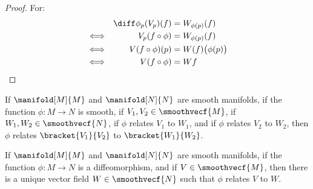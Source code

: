 \documentclass{article}                                                        %
\begin{document}
            \begin{proof}
                For:
                \begin{align}
                    &&\diff\phi_{p}(V_{p})(f)&=W_{\phi(p)}(f)\\
                    &\Longleftrightarrow&
                    V_{p}(f\circ\phi)&=W_{\phi(p)}(f)\\
                    &\Longleftrightarrow&
                    V(f\circ\phi)(p)&=W(f)\big(\phi(p)\big)\\
                    &\Longleftrightarrow&
                    V(f\circ\phi)&=Wf
                \end{align}
            \end{proof}
            \begin{theorem}
                If $\manifold[M]{M}$ and $\manifold[N]{N}$ are smooth manifolds,
                if the function $\phi:M\rightarrow{N}$ is smooth, if
                $V_{1},V_{2}\in\smoothvecf{M}$, if
                $W_{1},W_{2}\in\smoothvecf{N}$, if $\phi$ relates $V_{1}$ to
                $W_{1}$, and if $\phi$ relates $V_{2}$ to $W_{2}$, then
                $\phi$ relates $\bracket{V_{1}}{V_{2}}$ to
                $\bracket{W_{1}}{W_{2}}$.
            \end{theorem}
            \begin{theorem}
                If $\manifold[M]{M}$ and $\manifold[N]{N}$ are smooth manifolds,
                if the function $\phi:M\rightarrow{N}$ is a diffeomorphism, and
                if $V\in\smoothvecf{M}$, then there is a unique vector field
                $W\in\smoothvecf{N}$ such that $\phi$ relates $V$ to $W$.
            \end{theorem}
\end{document}
